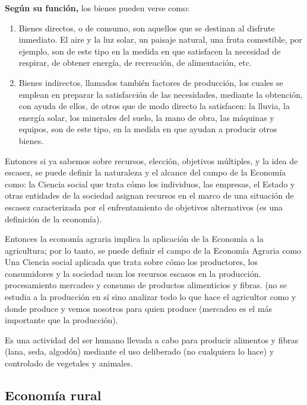\documentclass[
  letterpaper,
  DIV=11,
  numbers=noendperiod]{scrartcl}
\begin{document}
\textbf{Según su función,} los bienes pueden verse como:

\begin{enumerate}
\def\labelenumi{\arabic{enumi}.}
\item
  Bienes directos, o de consumo, son aquellos que se destinan al
  disfrute inmediato. El aire y la luz solar, un paisaje natural, una
  fruta comestible, por ejemplo, son de este tipo en la medida en que
  satisfacen la necesidad de respirar, de obtener energía, de
  recreación, de alimentación, etc.
\item
  Bienes indirectos, llamados también factores de producción, los cuales
  se emplean en preparar la satisfacción de las necesidades, mediante la
  obtención, con ayuda de ellos, de otros que de modo directo la
  satisfacen: la lluvia, la energía solar, los minerales del suelo, la
  mano de obra, las máquinas y equipos, son de este tipo, en la medida
  en que ayudan a producir otros bienes.
\end{enumerate}

Entonces si ya sabemos sobre recursos, elección, objetivos múltiples, y
la idea de escasez, se puede definir la naturaleza y el alcance del
campo de la Economía como: la Ciencia social que trata cómo los
individuos, las empresas, el Estado y otras entidades de la sociedad
asignan recursos en el marco de una situación de escasez caracterizada
por el enfrentamiento de objetivos alternativos (es una definición de la
economía).

Entonces la economía agraria implica la aplicación de la Economía a la
agricultura; por lo tanto, se puede definir el campo de la Economía
Agraria como Una Ciencia social aplicada que trata sobre cómo los
productores, los consumidores y la sociedad usan los recursos escasos en
la producción. procesamiento mercadeo y consumo de productos
alimenticios y fibras. (no se estudia a la producción en sí sino
analizar todo lo que hace el agricultor como y donde produce y vemos
nosotros para quien produce (mercadeo es el más importante que la
producción).

Es una actividad del ser humano llevada a cabo para producir alimentos y
fibras (lana, seda, algodón) mediante el uso deliberado (no cualquiera
lo hace) y controlado de vegetales y animales.

\hypertarget{economuxeda-rural}{%
\subsection{Economía rural}\label{economuxeda-rural}}
\end{document}
